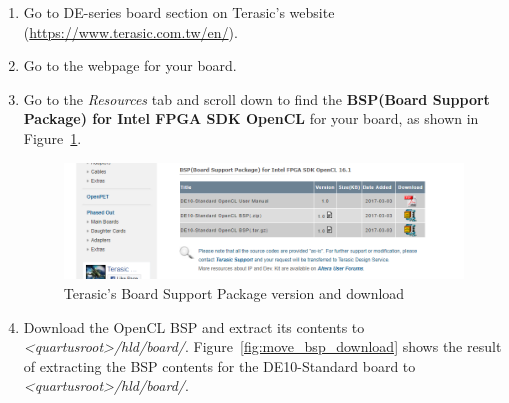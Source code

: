 \documentclass[11pt, twoside, pdftex]{article}
\begin{document}
\begin{enumerate}
\item Go to DE-series board section on Terasic's website (\url{https://www.terasic.com.tw/en/}).
\item Go to the webpage for your board.
\item Go to the \textit{Resources} tab and scroll down to find the \textbf{BSP(Board Support Package) for Intel FPGA SDK OpenCL} for your board, as shown in Figure~\ref{fig:terasic_bsp_download_2}.
	\begin{figure} [H]
	\begin{center}
	\includegraphics[scale = 0.7]{figures/fig_terasic_bsp_download.png}
	\end{center}
	\caption{Terasic's Board Support Package version and download}
	\label{fig:terasic_bsp_download_2}
	\end{figure}
\item Download the OpenCL BSP and extract its contents to \textit{<quartusroot>/hld/board/}. Figure~\ref{fig:move_bsp_download} shows the result of extracting the BSP contents for the DE10-Standard board to \textit{<quartusroot>/hld/board/}.
	

\end{enumerate}
\end{document}
